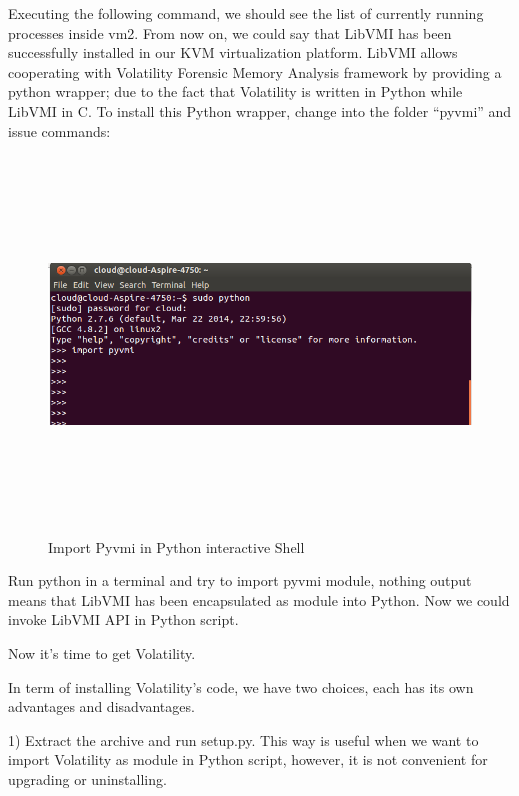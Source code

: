 Executing the following command, we should see the list of currently running processes inside vm2.
From now on, we could say that LibVMI has been successfully installed in our KVM virtualization platform. LibVMI allows 
cooperating with Volatility Forensic Memory Analysis framework by providing a python wrapper; due to the fact that 
Volatility is written in Python while LibVMI in C. To install this Python wrapper, change into the folder ``pyvmi'' and 
issue commands:
\begin{figure}[htbp]
	\centering
		\includegraphics[width=14cm, height= 10cm ]{Figures/Figure22.png}
	\caption[Import Pyvmi in Python interactive Shell]{Import Pyvmi in Python interactive Shell}
	\label{fig:Import Pyvmi in Python interactive Shell}
\end{figure}

Run python in a terminal and try to import pyvmi module, nothing output means that LibVMI has been encapsulated as module into Python. 
Now we could invoke LibVMI API in Python script.

Now it’s time to get Volatility.

In term of installing Volatility's code, we have two choices, each has its own advantages and disadvantages.

1) Extract the archive and run setup.py. This way is useful when we want to import Volatility as module in Python script, however, it is not 
convenient for upgrading or uninstalling.


